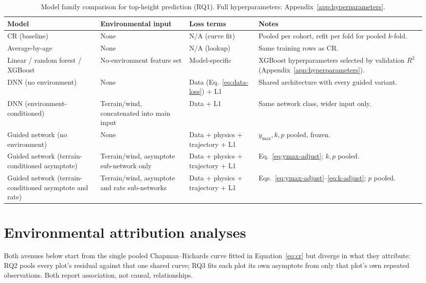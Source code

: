 \begin{table}[!htbp]
\centering
\scriptsize
\renewcommand{\arraystretch}{1.2}
\begin{tabular}{p{3.2cm}p{3cm}p{2.6cm}p{4.5cm}}
\toprule
Model & Environmental input & Loss terms & Notes \\
\midrule
CR (baseline) & None & N/A (curve fit) & Pooled per cohort, refit per fold for pooled $k$-fold. \\
Average-by-age & None & N/A (lookup) & Same training rows as CR. \\
Linear / random forest / XGBoost & No-environment feature set & Model-specific & XGBoost
hyperparameters selected by validation $R^2$ (Appendix~\ref{app:hyperparameters}). \\
DNN (no environment) & None & Data (Eq.~\ref{eq:data-loss}) + L1 & Shared architecture with every
guided variant. \\
DNN (environment-conditioned) & Terrain/wind, concatenated into main input & Data + L1 & Same
network class, wider input only. \\
Guided network (no environment) & None & Data + physics + trajectory + L1 & $y_{\max},k,p$
pooled, frozen. \\
Guided network (terrain-conditioned asymptote) & Terrain/wind, asymptote sub-network only & Data +
physics + trajectory + L1 & Eq.~\ref{eq:ymax-adjust}; $k,p$ pooled. \\
Guided network (terrain-conditioned asymptote and rate) & Terrain/wind, asymptote and rate
sub-networks & Data + physics + trajectory + L1 & Eqs.~\ref{eq:ymax-adjust}--\ref{eq:k-adjust};
$p$ pooled. \\
\bottomrule
\end{tabular}
\caption{Model family comparison for top-height prediction (RQ1). Full hyperparameters:
Appendix~\ref{app:hyperparameters}.}
\label{tab:rq1-models}
\end{table}

\section{Environmental attribution analyses}
\label{sec:attribution}

Both avenues below start from the single pooled Chapman--Richards curve fitted in
Equation~\ref{eq:cr} but diverge in what they attribute: RQ2 pools every plot's residual against
that one shared curve; RQ3 fits each plot its own asymptote from only that plot's own repeated
observations. Both report association, not causal, relationships.

